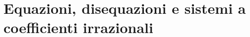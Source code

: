 % 
% 
% 
% 

\section{Equazioni, disequazioni e sistemi a coefficienti irrazionali}
\label{sec:radicali_equazioni}

